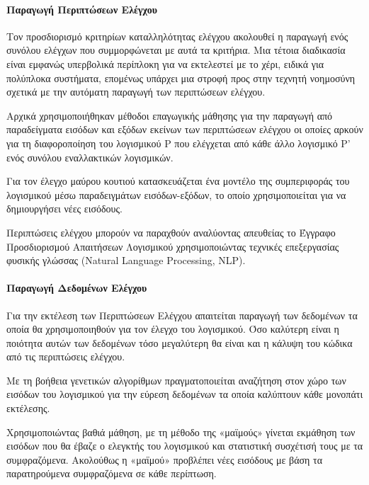 \documentclass[12pt]{article}
\begin{document}
\paragraph{Παραγωγή Περιπτώσεων Ελέγχου}
Τον προσδιορισμό κριτηρίων καταλληλότητας ελέγχου ακολουθεί η παραγωγή ενός συνόλου ελέγχων που συμμορφώνεται με αυτά τα κριτήρια. Μια τέτοια διαδικασία είναι εμφανώς υπερβολικά περίπλοκη για να εκτελεστεί με το χέρι, ειδικά για πολύπλοκα συστήματα, επομένως υπάρχει μια στροφή προς στην τεχνητή νοημοσύνη σχετικά με την αυτόματη παραγωγή των περιπτώσεων ελέγχου.
\par Αρχικά χρησιμοποιήθηκαν μέθοδοι επαγωγικής μάθησης για την παραγωγή από παραδείγματα εισόδων και εξόδων εκείνων των περιπτώσεων ελέγχου οι οποίες αρκούν για τη διαφοροποίηση του λογισμικού P που ελέγχεται από κάθε άλλο λογισμικό P’ ενός συνόλου εναλλακτικών λογισμικών.
\par Για τον έλεγχο μαύρου κουτιού κατασκευάζεται ένα μοντέλο της συμπεριφοράς του λογισμικού μέσω παραδειγμάτων εισόδων-εξόδων, το οποίο χρησιμοποιείται για να δημιουργήσει νέες εισόδους.
\par Περιπτώσεις ελέγχου μπορούν να παραχθούν αναλύοντας απευθείας το Έγγραφο Προσδιορισμού Απαιτήσεων Λογισμικού χρησιμοποιώντας τεχνικές επεξεργασίας φυσικής γλώσσας (Natural Language Processing, NLP).

\paragraph{Παραγωγή Δεδομένων Ελέγχου}
Για την εκτέλεση των Περιπτώσεων Ελέγχου απαιτείται παραγωγή των δεδομένων τα οποία θα χρησιμοποιηθούν για τον έλεγχο του λογισμικού. Όσο καλύτερη είναι η ποιότητα αυτών των δεδομένων τόσο μεγαλύτερη θα είναι και η κάλυψη του κώδικα από τις περιπτώσεις ελέγχου.
\par Με τη βοήθεια γενετικών αλγορίθμων πραγματοποιείται αναζήτηση στον χώρο των εισόδων του λογισμικού για την εύρεση δεδομένων τα οποία καλύπτουν κάθε μονοπάτι εκτέλεσης.
\par Χρησιμοποιώντας βαθιά μάθηση, με τη μέθοδο της «μαϊμούς» γίνεται εκμάθηση των εισόδων που θα έβαζε ο ελεγκτής του λογισμικού και στατιστική συσχέτισή τους με τα συμφραζόμενα. Ακολούθως η «μαϊμού» προβλέπει νέες εισόδους με βάση τα παρατηρούμενα συμφραζόμενα σε κάθε περίπτωση.
\end{document}

